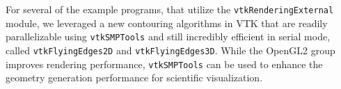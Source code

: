 For several of the example programs, that utilize the \texttt{vtkRenderingExternal} module, we leveraged a new contouring algorithms in VTK that are readily parallelizable using \texttt{vtkSMPTools} and still incredibly efficient in serial mode, called \texttt{vtkFlyingEdges2D} and \texttt{vtkFlyingEdges3D}.
While the OpenGL2 group improves rendering performance, \texttt{vtkSMPTools} can be used to enhance the geometry generation performance for scientific visualization.
